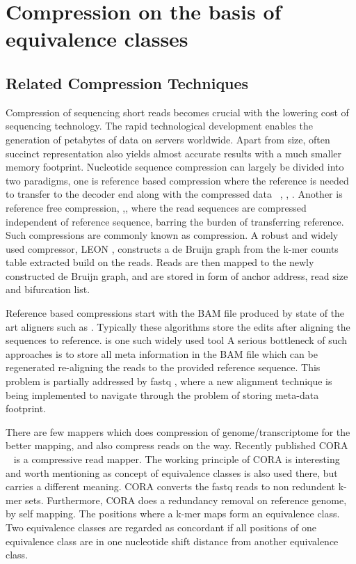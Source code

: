 \chapter{Compression on the basis of equivalence classes}

\section{Related Compression Techniques}
Compression of sequencing short reads becomes crucial with the lowering cost of sequencing technology. The rapid technological development enables the generation of petabytes of data on servers worldwide. Apart from size, often succinct representation \citep{Pritt2016} also yields almost accurate results with a much smaller memory footprint. Nucleotide sequence compression can largely be divided into two paradigms, one is reference based compression where the reference is needed to transfer to the decoder end along with the compressed data ~\citep{Canovas2014}, \citep{Fritz2011}, \citep{Li2014}. Another is reference free compression, \citep{adjeroh2002dna},\citep{Bonfield_2014}, \citep{Hach2012} where the read sequences are compressed independent of reference sequence, barring the burden of transferring reference. Such compressions are commonly known as \Denovo compression. A robust and widely used \denovo compressor, LEON \citep{Benoit2015}, constructs a de Bruijn graph from the k-mer counts table extracted build on the reads. Reads are then mapped to the newly constructed de Bruijn graph, and are stored in form of anchor address, read size and bifurcation list.   

Reference based compressions start with the BAM file produced by state of the art aligners such as \Bowtie. Typically these algorithms store the edits after aligning the sequences to reference. \citet{Fritz2011} is one such widely used tool A serious bottleneck of such approaches is to store all meta information in the BAM file which can be regenerated re-aligning the reads to the provided reference sequence. This problem is partially addressed by fastq \citep{bonfield2013compression}, where a new alignment technique is being implemented to navigate through the problem of storing meta-data footprint. 



There are few mappers which does compression of genome/transcriptome for the better mapping, and also compress reads on the way. Recently published CORA ~\citep{Yorukoglu2016} is a compressive read mapper. The working principle of CORA is interesting and worth mentioning as concept of equivalence classes is also used there, but carries a different meaning. CORA converts the fastq reads to non redundent k-mer sets. Furthermore, CORA does a redundancy removal on reference genome, by self mapping. The positions where a k-mer maps form an equivalence class. Two equivalence classes are regarded as concordant if all positions of one equivalence class are in one nucleotide shift distance from another equivalence class. 

